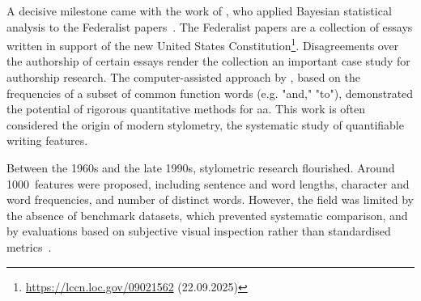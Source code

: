 

A decisive milestone came with the work of \citet{mosteller_1964}, who applied Bayesian statistical analysis to the Federalist papers~\citep{hamilton_federalist_1787}.
The Federalist papers are a collection of essays written in support of the new United States Constitution\footnote{\url{https://lccn.loc.gov/09021562} (22.09.2025)}.
Disagreements over the authorship of certain essays render the collection an important case study for authorship research.
The computer-assisted approach by \citet{mosteller_1964}, based on the frequencies of a subset of common function words (e.g. "and," "to"), demonstrated the potential of rigorous quantitative methods for \ac{aa}. 
This work is often considered the origin of modern stylometry, the systematic study of quantifiable writing features.

Between the 1960s and the late 1990s, stylometric research flourished.
Around \num{1000}~features were proposed, including sentence and word lengths, character and word frequencies, and number of distinct words. 
However, the field was limited by the absence of benchmark datasets, which prevented systematic comparison, and by evaluations based on subjective visual inspection rather than standardised metrics~\citep{stamatatos_survey_2009}.


